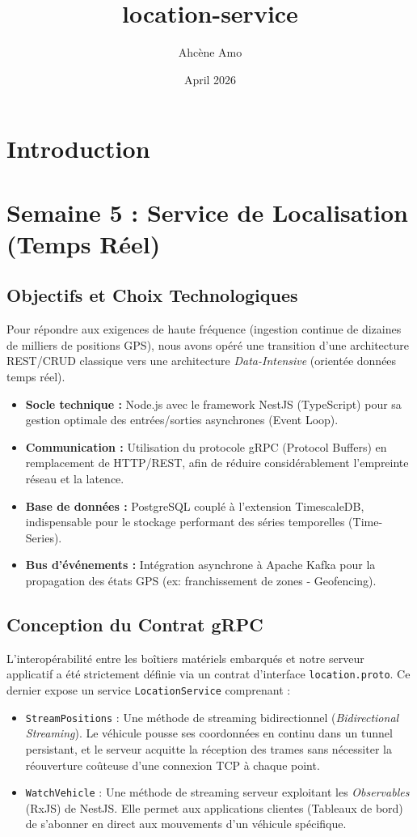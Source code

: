 \documentclass{article}
\title{location-service}
\author{Ahcène Amo}
\date{April 2026}
\begin{document}
\maketitle

\section{Introduction}

\section{Semaine 5 : Service de Localisation (Temps Réel)}

\subsection{Objectifs et Choix Technologiques}
Pour répondre aux exigences de haute fréquence (ingestion continue de dizaines de milliers de positions GPS), nous avons opéré une transition d'une architecture REST/CRUD classique vers une architecture \textit{Data-Intensive} (orientée données temps réel).
\begin{itemize}
    \item \textbf{Socle technique :} Node.js avec le framework NestJS (TypeScript) pour sa gestion optimale des entrées/sorties asynchrones (Event Loop).
    \item \textbf{Communication :} Utilisation du protocole gRPC (Protocol Buffers) en remplacement de HTTP/REST, afin de réduire considérablement l'empreinte réseau et la latence.
    \item \textbf{Base de données :} PostgreSQL couplé à l'extension TimescaleDB, indispensable pour le stockage performant des séries temporelles (Time-Series).
    \item \textbf{Bus d'événements :} Intégration asynchrone à Apache Kafka pour la propagation des états GPS (ex: franchissement de zones - Geofencing).
\end{itemize}

\subsection{Conception du Contrat gRPC}
L'interopérabilité entre les boîtiers matériels embarqués et notre serveur applicatif a été strictement définie via un contrat d'interface \texttt{location.proto}. Ce dernier expose un service \texttt{LocationService} comprenant :
\begin{itemize}
    \item \texttt{StreamPositions} : Une méthode de streaming bidirectionnel (\textit{Bidirectional Streaming}). Le véhicule pousse ses coordonnées en continu dans un tunnel persistant, et le serveur acquitte la réception des trames sans nécessiter la réouverture coûteuse d'une connexion TCP à chaque point.
    \item \texttt{WatchVehicle} : Une méthode de streaming serveur exploitant les \textit{Observables} (RxJS) de NestJS. Elle permet aux applications clientes (Tableaux de bord) de s'abonner en direct aux mouvements d'un véhicule spécifique.
\end{itemize}
\end{document}
